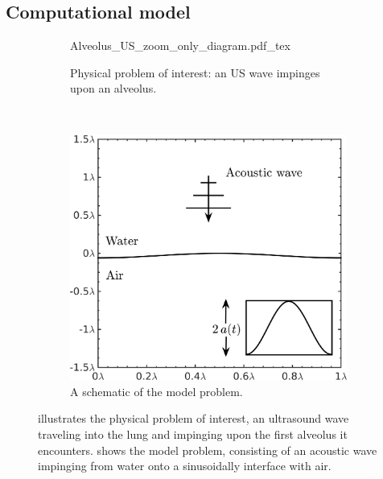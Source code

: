 \subsection{Computational model}
\label{subsec:setup}
%
\begin{figure}[!h]
  \centering
  \begin{subfigure}[b]{0.45\textwidth}
    \centering
    \def\svgwidth{\textwidth}
    {Alveolus_US_zoom_only_diagram.pdf_tex} \hfill%
    \caption{\label{fig:alveolar_schematic} Physical problem of interest: an \ac{US} wave impinges upon an alveolus.}
  \end{subfigure}
  ~
  \begin{subfigure}[b]{0.45\textwidth}
    \centering
   \includegraphics[width=\textwidth]{./figs/lung_figs/usbe_model_schematic2} \hfill
    \caption{\label{fig:problem_schematics} A schematic of the model problem.}
  \end{subfigure}
  \caption[A schematic view of the physical and model
  problems]{\protect{} illustrates the
    physical problem of interest, an ultrasound wave traveling into
    the lung and impinging upon the first alveolus it
    encounters. \protect{} shows the model
    problem, consisting of an acoustic wave impinging from water onto
    a sinusoidally interface with air.}
  \label{fig:schematics}
\end{figure}
